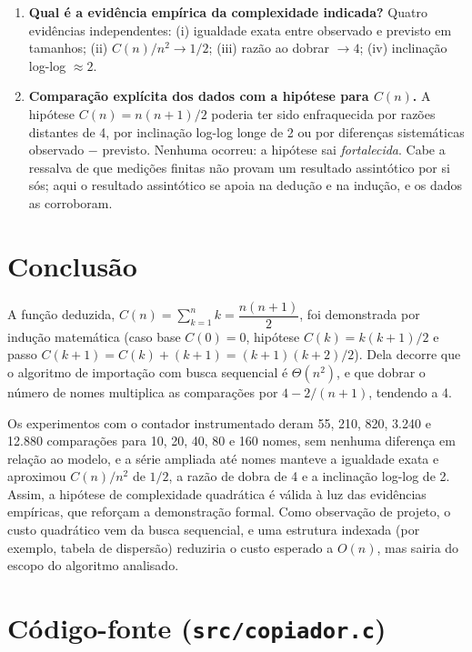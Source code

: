\documentclass[11pt,a4paper]{article}
\begin{document}
\begin{enumerate}[label=\textbf{\arabic*.}]
        garante a fórmula sob H1--H3 e as medições garantem que o
        código executa o que as hipóteses descrevem.
  \item \textbf{Qual é a evidência empírica da complexidade indicada?} Quatro
        evidências independentes: (i) igualdade exata entre observado e previsto
        em \totalpontos{} tamanhos; (ii) $C(n)/n^2\to 1/2$; (iii) razão ao
        dobrar $\to 4$; (iv) inclinação log-log \inclinacao{} $\approx 2$.
  \item \textbf{Comparação explícita dos dados com a hipótese para $C(n)$.} A
        hipótese $C(n)=n(n+1)/2$ poderia ter sido enfraquecida por razões
        distantes de 4, por inclinação log-log longe de 2 ou por diferenças
        sistemáticas observado $-$ previsto. Nenhuma ocorreu: a hipótese sai
        \emph{fortalecida}. Cabe a ressalva de que medições finitas não provam
        um resultado assintótico por si sós; aqui o resultado assintótico se
        apoia na dedução e na indução, e os dados as corroboram.
\end{enumerate}

\section{Conclusão}

A função deduzida, $C(n)=\sum_{k=1}^{n}k=\dfrac{n(n+1)}{2}$, foi demonstrada por
indução matemática (caso base $C(0)=0$, hipótese $C(k)=k(k+1)/2$ e passo
$C(k+1)=C(k)+(k+1)=(k+1)(k+2)/2$). Dela decorre que o algoritmo de importação
com busca sequencial é $\Theta(n^2)$, e que dobrar o número de nomes multiplica
as comparações por $4-2/(n+1)$, tendendo a 4.

Os experimentos com o contador instrumentado deram 55, 210, 820, 3.240 e 12.880
comparações para 10, 20, 40, 80 e 160 nomes, sem nenhuma diferença em relação
ao modelo, e a série ampliada até \maiorN{} nomes manteve a igualdade exata e
aproximou $C(n)/n^2$ de $1/2$, a razão de dobra de 4 e a inclinação log-log de 2.
Assim, a hipótese de complexidade quadrática é válida à luz das evidências
empíricas, que reforçam a demonstração formal. Como observação de projeto, o
custo quadrático vem da busca sequencial, e uma estrutura indexada (por exemplo,
tabela de dispersão) reduziria o custo esperado a $O(n)$, mas sairia do escopo
do algoritmo analisado.

\appendix
\section{Código-fonte (\texorpdfstring{\texttt{src/copiador.c}}{src/copiador.c})}

\end{document}
